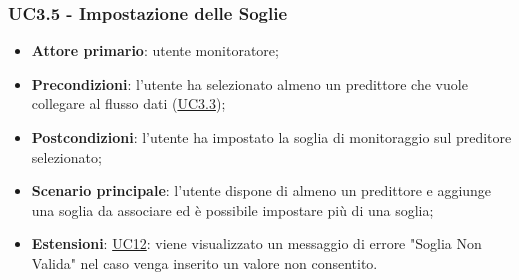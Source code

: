 	\subsubsection{UC3.5 - Impostazione delle Soglie}
		\begin{itemize}
			\item\textbf{Attore primario}: utente monitoratore;
			\item\textbf{Precondizioni}: l'utente ha selezionato almeno un predittore che vuole collegare al flusso dati (\hyperref[par:UC3.3]{UC3.3});
			\item\textbf{Postcondizioni}: l’utente ha impostato la soglia di monitoraggio sul preditore selezionato;
			\item\textbf{Scenario principale}: l’utente dispone di almeno un predittore e aggiunge una soglia da associare ed è possibile impostare più di una soglia; 
			\item\textbf{Estensioni}: \hyperref[par:UC12]{UC12}: viene visualizzato un messaggio di errore "Soglia Non Valida" nel caso venga inserito un valore non consentito.
		\end{itemize}

	\label{par:UC3.6}
